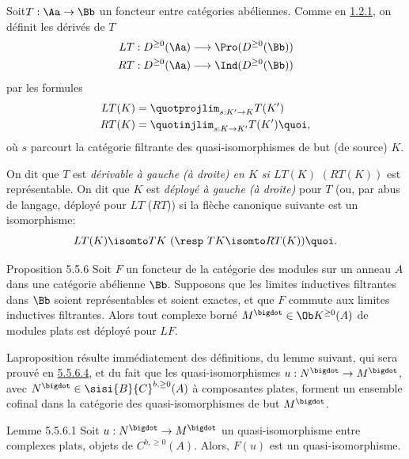 \setcounter{subsubsection}{4}
\subsubsection{}
Soit\pageoriginale $T:\Aa\rightarrow \Bb$ un foncteur
entre catégories abéliennes. Comme en \hyperref[XVII.def1.2.1]{1.2.1}, on définit les dérivés de
$T$
\begin{align*}
LT &: D^{\geq 0}(\Aa)\longrightarrow \Pro(D^{\geq
0}(\Bb))\\
RT &: D^{\geq 0}(\Aa)\longrightarrow \Ind(D^{\geq 0}(\Bb))
\end{align*}
par les formules
\begin{align*}
LT(K) &= \quotprojlim_{s:K'\rightarrow K}T(K')\\
RT(K) &= \quotinjlim_{s:K\rightarrow K'}T(K'){\quoi},
\end{align*}
où $s$ parcourt la catégorie filtrante des quasi-isomorphismes de but
(\resp de source) $K$.

On dit que $T$ est \emph{dérivable à gauche (\resp à droite) en $K$ si
$LT(K)$} $(RT(K))$ est représentable. On dit que $K$ est \emph{déployé
à gauche (\resp à droite)} pour $T$ (ou, par abus de langage,
déployé pour $LT$ (\resp $RT$)) si la flèche canonique suivante est un
isomorphisme:
\[
LT(K)\isomto  TK\text{ (\resp $TK \isomto  RT(K)$)}{\quoi}.
\]

\begin{enonce*}{Proposition 5.5.6}
Soit $F$ un foncteur de la catégorie des modules sur un anneau $A$
dans une catégorie abélienne $\Bb$. Supposons que les limites
inductives filtrantes dans $\Bb$ soient représentables et
soient exactes, et que $F$ commute aux limites inductives
filtrantes. Alors tout complexe borné $M^{\bigdot}\in \Ob K^{\geq
0}(A)$ de modules plats est déployé pour $LF$.
\end{enonce*}

La\pageoriginale proposition résulte immédiatement des définitions, du
lemme suivant, qui sera prouvé en \hyperref[XVII.par5.5.6.4]{5.5.6.4}, et du fait que les
quasi-isomorphismes $u:N^{\bigdot}\rightarrow M^{\bigdot}$, avec
$N^{\bigdot}\in \sisi{B}{C}^{b,\geq 0}(A)$ à composantes plates, forment un
ensemble cofinal dans la catégorie des quasi-isomorphismes de but
$M^{\bigdot}$.

\begin{enonce*}{Lemme 5.5.6.1}
Soit $u:N^{\bigdot}\rightarrow M^{\bigdot}$ un quasi-isomorphisme
entre complexes plats, objets de $C^{b,\geq 0}(A)$. Alors, $F(u)$ est
un quasi-isomorphisme.
\end{enonce*}

